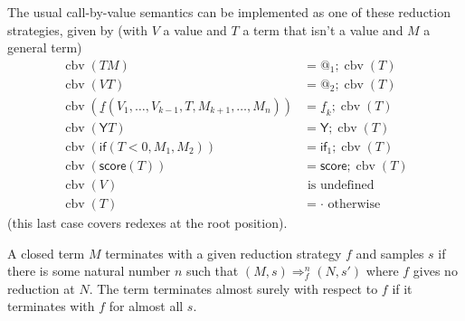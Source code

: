 \documentclass{article}
\newcommand{\tY}{\mathsf{Y}}
\newcommand{\tif}[3]{\mathsf{if}(#1, #2, #3)} %
\newcommand{\tscore}{\mathsf{score}}
\DeclareMathOperator{\cbv}{cbv}
\theoremstyle{definition}
\theoremstyle{lemma}
\theoremstyle{remark}
\begin{document}
The usual call-by-value semantics can be implemented as one of these reduction strategies, given by (with $V$ a value and $T$ a term that isn't a value and $M$ a general term)
\begin{align*}
\cbv(T M) & = @_1 ; \cbv(T) \\
\cbv(V T) & = @_2 ; \cbv(T) \\
\cbv(\underline f(V_1, \dots, V_{k-1}, T, M_{k+1}, \dots, M_n)) & = \underline f_k ; \cbv(T) \\
\cbv(\tY T) & = \tY ; \cbv(T) \\
\cbv(\tif{T < 0}{M_1}{M_2}) & = \textsf{if}_1 ; \cbv(T) \\
\cbv(\tscore(T)) & = \tscore ; \cbv(T) \\
\cbv(V) & \text{ is undefined} \\
\cbv(T) & = \cdot \text{ otherwise}
\end{align*}
(this last case covers redexes at the root position).

A closed term $M$ terminates with a given reduction strategy $f$ and samples $s$ if there is some natural number $n$ such that $(M,s) \Rightarrow_f^n (N,s')$ where $f$ gives no reduction at $N$. The term terminates almost surely with respect to $f$ if it terminates with $f$ for almost all $s$.
\end{document}
